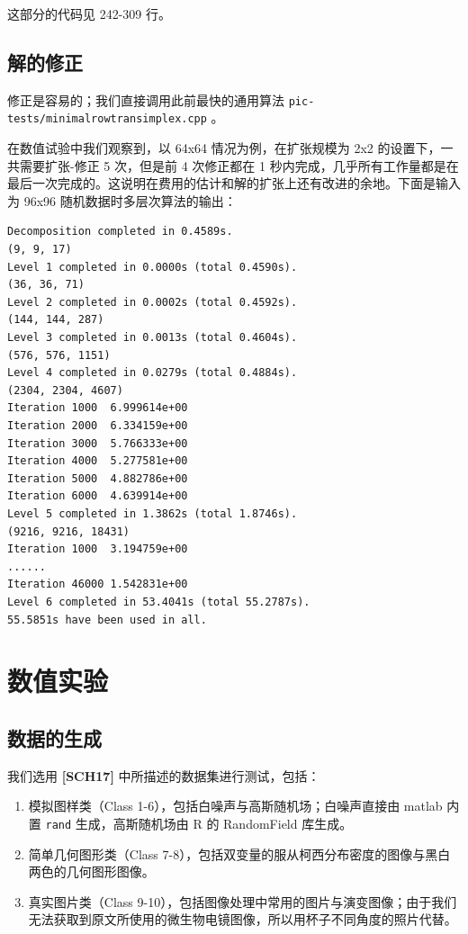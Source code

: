 \documentclass[]{article}
\begin{document}
这部分的代码见 242-309 行。

\subsection{解的修正}

修正是容易的；我们直接调用此前最快的通用算法
\texttt{pic-tests/minimalrowtransimplex.cpp} 。

在数值试验中我们观察到，以 64x64 情况为例，在扩张规模为 2x2
的设置下，一共需要扩张-修正 5 次，但是前 4 次修正都在 1
秒内完成，几乎所有工作量都是在最后一次完成的。这说明在费用的估计和解的扩张上还有改进的余地。下面是输入为
96x96 随机数据时多层次算法的输出：

\begin{verbatim}
Decomposition completed in 0.4589s.
(9, 9, 17)
Level 1 completed in 0.0000s (total 0.4590s).
(36, 36, 71)
Level 2 completed in 0.0002s (total 0.4592s).
(144, 144, 287)
Level 3 completed in 0.0013s (total 0.4604s).
(576, 576, 1151)
Level 4 completed in 0.0279s (total 0.4884s).
(2304, 2304, 4607)
Iteration 1000	6.999614e+00
Iteration 2000	6.334159e+00
Iteration 3000	5.766333e+00
Iteration 4000	5.277581e+00
Iteration 5000	4.882786e+00
Iteration 6000	4.639914e+00
Level 5 completed in 1.3862s (total 1.8746s).
(9216, 9216, 18431)
Iteration 1000	3.194759e+00
......
Iteration 46000	1.542831e+00
Level 6 completed in 53.4041s (total 55.2787s).
55.5851s have been used in all.
\end{verbatim}

\section{数值实验}

\subsection{数据的生成}

我们选用 \textbf{{[}SCH17{]}} 中所描述的数据集进行测试，包括：

\begin{enumerate}
\def\labelenumi{\arabic{enumi}.}
\item
  模拟图样类（Class 1-6），包括白噪声与高斯随机场；白噪声直接由 matlab
  内置 \texttt{rand} 生成，高斯随机场由 R 的 RandomField 库生成。
\item
  简单几何图形类（Class
  7-8），包括双变量的服从柯西分布密度的图像与黑白两色的几何图形图像。
\item
  真实图片类（Class
  9-10），包括图像处理中常用的图片与演变图像；由于我们无法获取到原文所使用的微生物电镜图像，所以用杯子不同角度的照片代替。
\end{enumerate}
\end{document}
